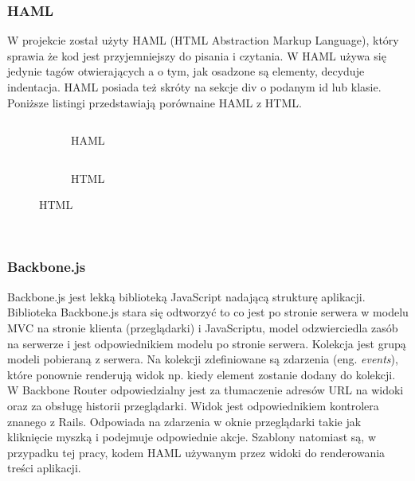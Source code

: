 \documentclass[11pt,a4paper, twoside]{article}
\begin{document}
\subsubsection{HAML}
W projekcie został użyty HAML (HTML Abstraction Markup Language), który sprawia że kod jest przyjemniejszy do pisania i czytania. W HAML używa się jedynie tagów otwierających a o tym, jak osadzone są elementy, decyduje indentacja. HAML posiada też skróty na sekcje div o podanym id lub klasie. Poniższe listingi przedstawiają porównaine HAML z HTML.
\begin{figure}[H]
\centering
\begin{subfigure}[t]{0.45\textwidth}
\caption{HAML}
\begin{listing}[H]
\inputminted[linenos=true]{haml}{./src/example.haml}
\end{listing}
\end{subfigure}
\begin{subfigure}[t]{0.45\textwidth}
\caption{HTML}
\begin{listing}[H]
\inputminted{html}{./src/example.html}
\end{listing}
\end{subfigure}
\end{figure}
$\label{haml}$
\subsubsection{Backbone.js}
Backbone.js jest lekką biblioteką JavaScript nadającą strukturę aplikacji.
Biblioteka Backbone.js stara się odtworzyć to co jest po stronie serwera w modelu MVC na stronie klienta (przeglądarki) i JavaScriptu, model odzwierciedla zasób na serwerze i jest odpowiednikiem modelu po stronie serwera. Kolekcja jest grupą modeli pobieraną z serwera. Na kolekcji zdefiniowane są zdarzenia (eng. \emph{events}), które ponownie renderują widok np. kiedy element zostanie dodany do kolekcji. W Backbone Router odpowiedzialny jest za tłumaczenie adresów URL na widoki oraz za obsługę historii przeglądarki. Widok jest odpowiednikiem kontrolera znanego z Rails. Odpowiada na zdarzenia w oknie przeglądarki takie jak kliknięcie myszką i podejmuje odpowiednie akcje. Szablony natomiast są, w przypadku tej pracy, kodem HAML używanym przez widoki do renderowania treści aplikacji.
\newpage
\end{document}
